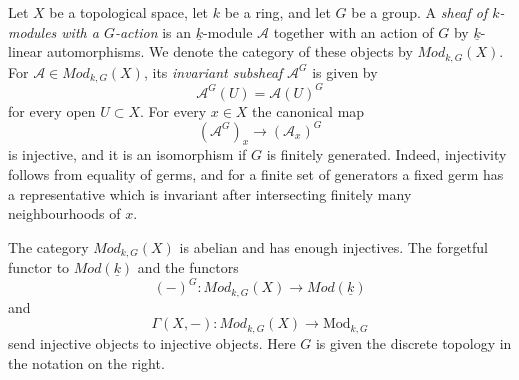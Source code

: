 \begin{definition}
\label{definition-sheaf-group-invariants}
\begin{reference}
\cite[Chapter IV, \S 4.4, pp. 193--194]{Tohoku}
\end{reference}
Let $X$ be a topological space, let $k$ be a ring, and let $G$ be a group.
A \emph{sheaf of $k$-modules with a $G$-action} is an
$\underline{k}$-module $\mathcal{A}$ together with an action of $G$ by
$\underline{k}$-linear automorphisms. We denote the category of these
objects by $\textit{Mod}_{k, G}(X)$. For
$\mathcal{A} \in \textit{Mod}_{k, G}(X)$, its \emph{invariant subsheaf}
$\mathcal{A}^G$ is given by
$$
\mathcal{A}^G(U) = \mathcal{A}(U)^G
$$
for every open $U \subset X$.
For every $x \in X$ the canonical map
$$
(\mathcal{A}^G)_x \longrightarrow (\mathcal{A}_x)^G
$$
is injective, and it is an isomorphism if $G$ is finitely generated.
Indeed, injectivity follows from equality of germs, and for a finite set of
generators a fixed germ has a representative which is invariant after
intersecting finitely many neighbourhoods of $x$.
\end{definition}

\begin{lemma}
\label{lemma-sheaves-group-action-injectives}
The category $\textit{Mod}_{k, G}(X)$ is abelian and has enough injectives.
The forgetful functor to $\textit{Mod}(\underline{k})$ and the functors
$$
(-)^G : \textit{Mod}_{k, G}(X) \longrightarrow
\textit{Mod}(\underline{k})
$$
and
$$
\Gamma(X, -) : \textit{Mod}_{k, G}(X) \longrightarrow
\text{Mod}_{k, G}
$$
send injective objects to injective objects. Here $G$ is given the discrete
topology in the notation on the right.
\end{lemma}

